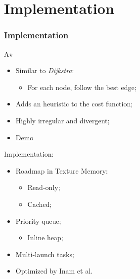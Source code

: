 \section{Implementation}

\begin{frame}
	\frametitle{Implementation}
	A$\star$
	\begin{itemize}
		\item Similar to \textit{Dijkstra}:
		\begin{itemize}
			\item For each node, follow the best edge;
		\end{itemize}
		\item Adds an heuristic to the cost function;
		\item Highly irregular and divergent;
		\item \href{http://www.youtube.com/watch?v=qo7B44zlYdQ}{Demo}
	\end{itemize}
	\vfill
	\pause
	Implementation:
	\begin{itemize}
		\item Roadmap in Texture Memory:
		\begin{itemize}
			\item Read-only;
			\item Cached;
		\end{itemize}
		\item Priority queue;
		\begin{itemize}
			\item Inline heap;
		\end{itemize}
		\item Multi-launch tasks;
		\item Optimized by Inam et al.
	\end{itemize}
\end{frame}